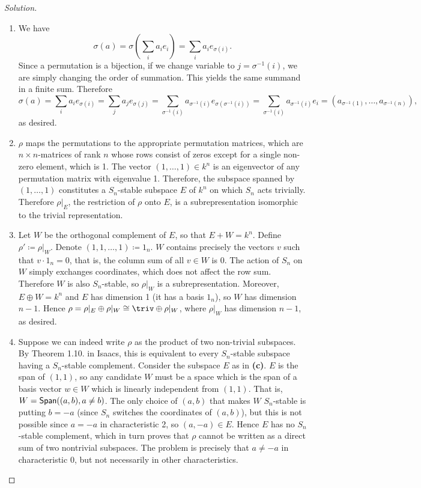 \begin{proof}[Solution]
\hfill
\begin{enumerate}[font=\normalfont,label=\textbf{(\alph*)}, wide]

\item We have
\[
\sigma(a) = \sigma\left( \sum_i a_ie_i \right) = \sum_i a_i e_{\sigma(i)}.
\]
Since a permutation is a bijection, if we change variable to $j = \sigma^{-1}(i)$, we are simply changing the order of summation. This yields the same summand in a finite sum. Therefore
\[
\sigma(a) = \sum_i a_i e_{\sigma(i)} = \sum_j a_j e_{\sigma(j)} = \sum_{\sigma^{-1}(i)} a_{\sigma^{-1}(i)} e_{\sigma(\sigma^{-1}(i))} = \sum_{\sigma^{-1}(i)} a_{\sigma^{-1}(i)} e_{i} = (a_{\sigma^{-1}(1)}, \ldots , a_{\sigma^{-1}(n)}),
\]
as desired.

\item $\rho$ maps the permutations to the appropriate permutation matrices, which are $n\times n$-matrices of rank $n$ whose rows consist of zeros except for a single non-zero element, which is 1. The vector $(1, \ldots, 1) \in k^n$ is an eigenvector of any permutation matrix with eigenvalue 1. Therefore, the subspace spanned by $(1, \ldots, 1)$ constitutes a $S_n$-stable subspace $E$ of $k^n$ on which $S_n$ acts trivially. Therefore $\rho |_E$, the restriction of $\rho$ onto $E$, is a subrepresentation isomorphic to the trivial representation.
\item Let $W$ be the orthogonal complement of $E$, so that $E + W = k^n$. Define $\rho' \coloneqq \rho |_W$. Denote $(1, 1, \ldots, 1) \coloneqq 1_n$. $W$ contains precisely the vectors $v$ such that $v\cdot 1_n = 0$, that is, the column sum of all $v\in W$ is 0. The action of $S_n$ on $W$ simply exchanges coordinates, which does not affect the row sum. Therefore $W$ is also $S_n$-stable, so $\rho |_W$ is a subrepresentation. Moreover, $E \oplus W = k^n$ and $E$ has dimension 1 (it has a basis $1_n$), so $W$ has dimension $n-1$. Hence $\rho = \rho |_E \oplus \rho |_W \cong \triv \oplus \rho|_W$, where $\rho|_W$ has dimension $n-1$, as desired.

\item Suppose we can indeed write $\rho$ as the product of two non-trivial subspaces. By Theorem 1.10. in Isaacs, this is equivalent to every $S_n$-stable subspace having a $S_n$-stable complement. Consider the subspace $E$ as in \textbf{(c)}. $E$ is the span of $(1, 1)$, so any candidate $W$ must be a space which is the span of a basis vector $w \in W$ which is linearly independent from $(1, 1)$. That is, $W = \mathsf{Span}((a, b), a \neq b)$. The only choice of $(a, b)$ that makes $W$ $S_n$-stable is putting $b= -a$ (since $S_n$ switches the coordinates of $(a, b)$), but this is not possible since $a = -a$ in characteristic 2, so $(a, -a) \in E$. Hence $E$ has no $S_n$-stable complement, which in turn proves that $\rho$ cannot be written as a direct sum of two nontrivial subspaces. The problem is precisely that $a \neq -a$ in characteristic 0, but not necessarily in other characteristics.


\end{enumerate}
\end{proof}
